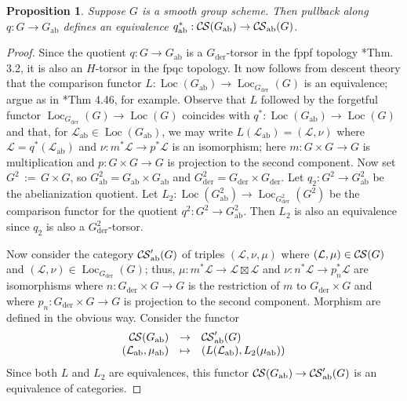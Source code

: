 \documentclass[10pt]{amsart}
\theoremstyle{plain}
\newtheorem{proposition}[theorem]{Proposition}
\theoremstyle{definition}
\DeclareMathOperator{\Loc}{Loc}
\newcommand{\der}{_{\operatorname{der}}}
\newcommand{\ab}{_{\operatorname{ab}}}
\newcommand{\ceq}{{\, :=\, }}
\newcommand{\cs}[1]{{\mathcal{#1}}}
\newcommand{\CS}{{\mathcal{C\hskip-0.8pt S}}}
\newcommand{\CSab}{\CS_{\operatorname{ab}}}
\begin{document}

\begin{proposition} \label{prop:CSGabab}
Suppose $G$ is a smooth group scheme.  
Then pullback along $q : G \to G\ab$ defines an equivalence $q\ab^*: \CS(G\ab) \to \CSab(G)$.
\end{proposition}
\begin{proof}
Since the quotient $q : G \to G\ab$ is a $G\der$-torsor in the fppf topology \cite{demazure:SGA3-VIA}*{Thm. 3.2}, 
it is also an $H$-torsor in the fpqc topology.  
It now follows from descent theory that the comparison functor $L : \Loc(G\ab) \to \Loc_{G\der}(G)$ is an equivalence; argue as in \cite{Vistoli:notes}*{Thm 4.46}, for example. 
Observe that $L$ followed by the forgetful functor $\Loc_{G\der}(G)\to  \Loc(G)$ coincides with $q^*: \Loc(G\ab)\to \Loc(G)$ and that, for $\cs{L}\ab\in \Loc(G\ab)$, we may write $L(\cs{L}\ab) = (\cs{L}, \nu)$ where $\cs{L} = q^*(\cs{L}\ab)$ and $\nu : m^*\cs{L}  \to p^*\cs{L}$ is an isomorphism; here $m : G\times G\to G$ is  multiplication and $p : G\times  G \to G$ is projection to the second component.
%
Now set $G^2 \ceq G\times G$, so $G^2\ab =  G\ab \times G\ab$ and $G^2\der = G\der \times G\der$. Let $q_2 : G^2 \to G^2\ab$ be the abelianization quotient.  
Let $L_2 : \Loc(G^2\ab) \to \Loc_{G^2\der}(G^2)$ be the comparison functor for the quotient $q^2  : G^2 \to G^2\ab$.
Then $L_2$ is also an equivalence since $q_2$ is also a $G^2\der$-torsor.

Now consider the category $\CSab'(G)$ of triples $(\cs{L},\nu,\mu)$ where $(\cs{L},\mu)\in \CS(G)$ and $(\cs{L},\nu)\in \Loc_{G\der}(G)$; thus, $\mu : m^*\cs{L} \to \cs{L}\boxtimes\cs{L}$ and $\nu :  n^*\cs{L} \to p_n^*\cs{L}$ are isomorphisms where $n : G\der\times G\to G$ is the restriction of $m$ to $G\der\times G$ and where $p_n : G\der\times G\to G$ is projection to the second component. 
Morphism are defined in the obvious way. 
Consider the functor
\[
\begin{array}{rcl}
\CS(G\ab) &\to& \CSab'(G) \\
(\cs{L}\ab,\mu\ab) &\mapsto& (L(\cs{L}\ab), L_2(\mu\ab))
\end{array}
\]
Since both $L$ and $L_2$ are equivalences, this functor $\CS(G\ab) \to \CSab'(G)$ is an equivalence of categories.


\end{proof}
\end{document}
